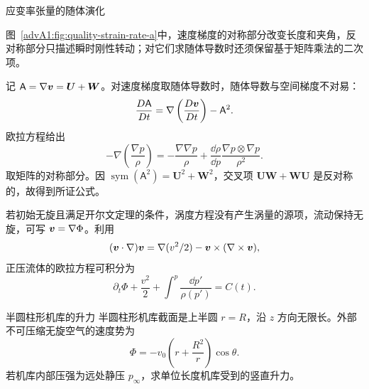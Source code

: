 {\begin{advexamplebox}{应变率张量的随体演化}
\begin{qualityfigure}
\label{advA1:fig:quality-strain-rate-q}
\end{qualityfigure}
\end{advexamplebox}
\begin{advsolution}
\begin{qualityfigure}
\label{advA1:fig:quality-strain-rate-a}
\end{qualityfigure}
图~\ref{advA1:fig:quality-strain-rate-a}中，速度梯度的对称部分改变长度和夹角，反对称部分只描述瞬时刚性转动；对它们求随体导数时还须保留基于矩阵乘法的二次项。

记 $\mathsf A=\nabla\bm{v}=\bm U+\bm W$。对速度梯度取随体导数时，随体导数与空间梯度不对易：
\[
 \frac{D\mathsf A}{Dt}
 =\nabla\left(\frac{D\bm{v}}{Dt}\right)-\mathsf A^2.
\]
欧拉方程给出
\[
 -\nabla\left(\frac{\nabla p}{\rho}\right)
 =-\frac{\nabla\nabla p}{\rho}
 +\frac{\dd\rho}{\dd p}\frac{\nabla p\otimes\nabla p}{\rho^2}.
\]
取矩阵的对称部分。因
$\operatorname{sym}(\mathsf A^2)=\bm U^2+\bm W^2$，交叉项
$\bm U\bm W+\bm W\bm U$ 是反对称的，故得到所证公式。
\end{advsolution}

若初始无旋且满足开尔文定理的条件，涡度方程没有产生涡量的源项，流动保持无旋，可写
$\bm{v}=\nabla\Phi$。利用
\[
 (\bm{v}\cdot\nabla)\bm{v}
 =\nabla(v^2/2)-\bm{v}\times(\nabla\times\bm{v}),
\]
正压流体的欧拉方程可积分为
\[
 \partial_t\Phi+\frac{v^2}{2}+\int^p\frac{\dd p'}{\rho(p')}=C(t).
\]

\begin{advexamplebox}{半圆柱形机库的升力}\label{advA1:ex:hangar-lift}
半圆柱形机库截面是上半圆 $r=R$，沿 $z$ 方向无限长。外部不可压缩无旋空气的速度势为
\[
 \Phi=-v_0\left(r+\frac{R^2}{r}\right)\cos\theta.
\]
若机库内部压强为远处静压 $p_\infty$，求单位长度机库受到的竖直升力。


\end{advexamplebox}}
